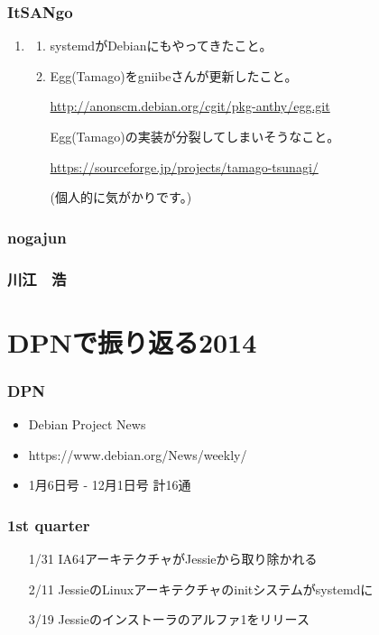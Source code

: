 \documentclass[cjk,dvipdfmx,10pt,compress,%
hyperref={bookmarks=true,bookmarksnumbered=true,bookmarksopen=false,%
colorlinks=false,%
pdftitle={第 92 回 関西 Debian 勉強会},%
pdfauthor={倉敷・のがた・佐々木・かわだ},%
pdfsubject={資料},%
}]{beamer}
\begin{document}
\begin{frame}
  \frametitle{ ItSANgo }
  \begin{enumerate}
  \item
    \begin{enumerate}
    \item systemdがDebianにもやってきたこと。
    \item Egg(Tamago)をgniibeさんが更新したこと。

      \url{http://anonscm.debian.org/cgit/pkg-anthy/egg.git}

      Egg(Tamago)の実装が分裂してしまいそうなこと。

      \url{https://sourceforge.jp/projects/tamago-tsunagi/}

      (個人的に気がかりです。)
    \end{enumerate}
  \end{enumerate}
\end{frame}

\begin{frame}
  \frametitle{ nogajun }
\end{frame}

\begin{frame}
  \frametitle{ 川江　浩 }
\end{frame}


\section{DPNで振り返る2014}

\begin{frame}[fragile]
  \frametitle{DPN}
  \begin{itemize}
  \item Debian Project News
  \item https://www.debian.org/News/weekly/
  \item 1月6日号 - 12月1日号 計16通
  \end{itemize}
\end{frame}

\begin{frame}[fragile]
  \frametitle{1st quarter}
  \begin{itemize}
  \item[1/31] IA64アーキテクチャがJessieから取り除かれる
  \item[2/11] JessieのLinuxアーキテクチャのinitシステムがsystemdに
  \item[3/19] Jessieのインストーラのアルファ1をリリース
  \end{itemize}
\end{frame}
\end{document}
